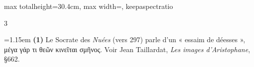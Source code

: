 \documentclass[11pt,twoside]{book}
\newcommand{\currHeadLE}{}
\newcommand{\currHeadRE}{}
\newcommand{\currHeadLO}{}
\newcommand{\currHeadRO}{}
\newcommand{\italique}[1]{\textit{#1}}
\newcommand{\R}{\textbf{R}}
\begin{document}
\begin{adjustbox}{max totalheight=30.4cm, max width=\textwidth, keepaspectratio}
\begin{minipage}{\textwidth}
{\begin{multicols}{3}
\par\vspace{1.2pt}\par\nopagebreak\vspace{1pt}\noindent\hangindent=1.15em {\color{sepiaNote}\textbf{(1)}} Le Socrate des \italique{Nuées} (vers 297) parle d'un « essaim de déesses », μέγα γάρ τι θεῶν κινεῖται σμῆνος. Voir Jean Taillardat, \italique{Les images d'Aristophane}, §662.
\par\end{multicols}}
\end{minipage}\end{adjustbox}
\clearpage\ifodd\value{page}\hbox{}\newpage\fi
\renewcommand{\currHeadLE}{ΑΡΙΣΤΟΦΑΝΟΥΣ ΘΕΣΜΟΦΟΡΙΑΖΟΥΣΑΙ · CODEX RAVENNAS 429 (\R)}
\renewcommand{\currHeadRE}{Folio f. 163r (Classense 165r) · vv. 43–79}
\renewcommand{\currHeadLO}{FAC-SIMILÉ DU CODEX RAVENNAS 429 (\R) · f. 163r (Classense 165r)}
\renewcommand{\currHeadRO}{vv. 43–79 · Planche recadrée sur la zone écrite et harmonisée}
\end{document}
